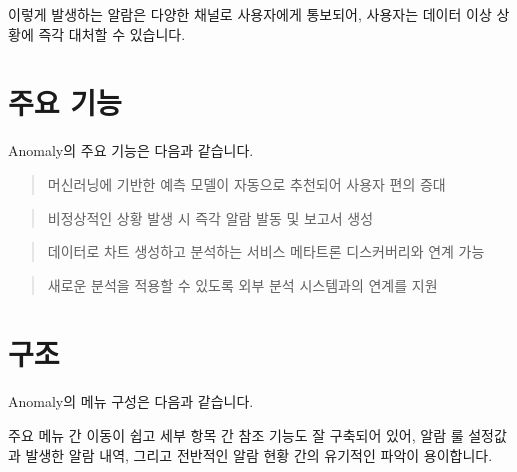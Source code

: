 \documentclass[letterpaper,10pt,english]{sphinxmanual}
\begin{document}
이렇게 발생하는 알람은 다양한 채널로 사용자에게 통보되어, 사용자는 데이터 이상 상황에 즉각 대처할 수 있습니다.


\section{주요 기능}
\label{\detokenize{part01/index:id2}}
Anomaly의 주요 기능은 다음과 같습니다.

\begin{quote}

머신러닝에 기반한 예측 모델이 자동으로 추천되어 사용자 편의 증대
\end{quote}

\begin{quote}

비정상적인 상황 발생 시 즉각 알람 발동 및 보고서 생성
\end{quote}

\begin{quote}

데이터로 차트 생성하고 분석하는 서비스 메타트론 디스커버리와 연계 가능
\end{quote}

\begin{quote}

새로운 분석을 적용할 수 있도록 외부 분석 시스템과의 연계를 지원
\end{quote}


\section{구조}
\label{\detokenize{part01/index:id3}}
Anomaly의 메뉴 구성은 다음과 같습니다.
\begin{quote}

\begin{figure}[H]
\centering

\noindent{}
\end{figure}
\end{quote}

주요 메뉴 간 이동이 쉽고 세부 항목 간 참조 기능도 잘 구축되어 있어, 알람 룰 설정값과 발생한 알람 내역, 그리고 전반적인 알람 현황 간의 유기적인 파악이 용이합니다.
\end{document}
